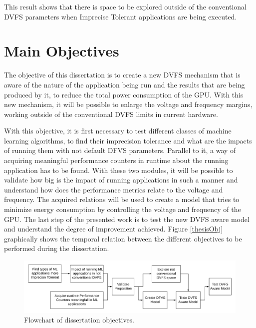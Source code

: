 This result shows that there is space to be explored outside of the conventional DVFS parameters when Imprecise Tolerant applications are being executed.


\section{Main Objectives}
\label{section:objectives}

The objective of this dissertation is to create a new DVFS mechanism that is aware of the nature of the application being run and the results that are being produced by it, to reduce the total power consumption of the GPU. With this new mechanism, it will be possible to enlarge the voltage and frequency margins, working outside of the conventional DVFS limits in current hardware. 

With this objective, it is first necessary to test different classes of machine learning algorithms, to find their imprecision tolerance and what are the impacts of running them with not default DFVS parameters. Parallel to it, a way of acquiring meaningful performance counters in runtime about the running application has to be found. With these two modules, it will be possible to validate how big is the impact of running applications in such a manner and understand how does the performance metrics relate to the voltage and frequency. The acquired relations will be used to create a model that tries to minimize energy consumption by controlling the voltage and frequency of the GPU. The last step of the presented work is to test the new DVFS aware model and understand the degree of improvement achieved. Figure \ref{thesisObj} graphically shows the temporal relation between the different objectives to be performed during the dissertation.

\begin{figure}[!htb]
  \centering
  \includegraphics[width=1\textwidth]{Figures/Introduction/Dissertation_Objectives.png}
  \caption[]{Flowchart of dissertation objectives.}
  \label{fig:thesisObj}
\end{figure}